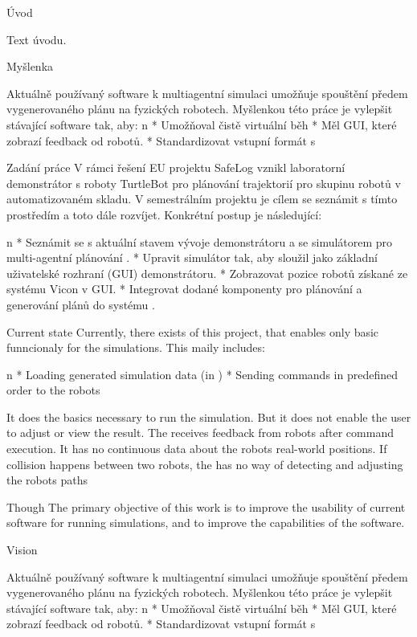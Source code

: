 



\chap Úvod


Text úvodu.

\sec Myšlenka

Aktuálně používaný software k multiagentní simulaci umožňuje spouštění předem vygenerovaného plánu na fyzických robotech. Myšlenkou této práce je vylepšit stávající software tak, aby:
\begitems \style n
    * Umožňoval čistě virtuální běh
    * Měl GUI, které zobrazí feedback od robotů.
    * Standardizovat vstupní formát s \mapfIR
\enditems

\sec Zadání práce
V rámci řešení EU projektu SafeLog vznikl laboratorní demonstrátor s roboty TurtleBot pro plánování trajektorií pro skupinu robotů v automatizovaném skladu. V semestrálním projektu je cílem se seznámit s tímto prostředím a toto dále rozvíjet. Konkrétní postup je následující:


\begitems \style n
    * Seznámit se s aktuální stavem vývoje demonstrátoru a se simulátorem pro multi-agentní plánování \mapfIR.
    * Upravit simulátor tak, aby sloužil jako základní uživatelské rozhraní (GUI) demonstrátoru.
    * Zobrazovat pozice robotů získané ze systému Vicon v GUI.
    * Integrovat dodané komponenty pro plánování a generování plánů do systému .
\enditems

\sec Current state
Currently, there exists {\oldRepo} of this project, that enables only basic funncionaly for the simulations. This maily includes:

\begitems \style n
    * Loading generated simulation data (in {\oldFormat})
    * Sending commands in predefined order to the robots
\enditems

It does the basics necessary to run the simulation. But it does not enable the user to adjust or view the result.
The {\oldRepo} receives feedback from robots after command execution. It has no continuous data about the robots real-world positions. If collision happens between two robots, the {\oldRepo} has no way of detecting and adjusting the robots paths

\sec Though
The primary objective of this work is to improve the usability of current software for running simulations, and to improve the capabilities of the software.

\sec Vision

Aktuálně používaný software k multiagentní simulaci umožňuje spouštění předem vygenerovaného plánu na fyzických robotech. Myšlenkou této práce je vylepšit stávající software tak, aby:
\begitems \style n
    * Umožňoval čistě virtuální běh
    * Měl GUI, které zobrazí feedback od robotů.
    * Standardizovat vstupní formát s \mapfIR
\enditems




\bye
\endtt
